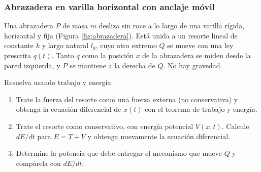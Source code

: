 \subsubsection{Abrazadera en varilla horizontal con anclaje móvil}

Una abrazadera $P$ de masa $m$ desliza sin roce a lo largo de una varilla rígida, horizontal y fija (Figura \ref{fig:abrazadera}). Está unida a un resorte lineal de constante $k$ y largo natural $l_0$, cuyo otro extremo $Q$ se mueve con una ley prescrita $q(t)$. Tanto $q$ como la posición $x$ de la abrazadera se miden desde la pared izquierda, y $P$ se mantiene a la derecha de $Q$. No hay gravedad.

Resuelva usando trabajo y energía:
\begin{enumerate}
    \item Trate la fuerza del resorte como una fuerza externa (no conservativa) y obtenga la ecuación diferencial de $x(t)$ con el teorema de trabajo y energía.
    \item Trate el resorte como conservativo, con energía potencial $V(x,t)$. Calcule $dE/dt$ para $E=T+V$ y obtenga nuevamente la ecuación diferencial.
    \item Determine la potencia que debe entregar el mecanismo que mueve $Q$ y compárela con $dE/dt$.
\end{enumerate}

